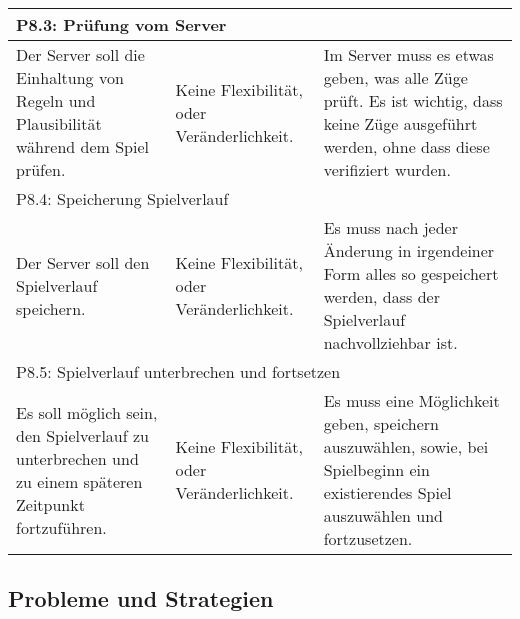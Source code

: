 \documentclass[fontsize=12pt,paper=a4,twoside]{scrartcl}
\begin{document}
\begin{longtable}[c]{|p{5cm}|p{5cm}|p{5cm}|}
\\ \hline
\multicolumn{3}{|l|}{{P8.3: Prüfung vom Server}} 
\\ \hline
Der Server soll die Einhaltung von Regeln und Plausibilität während dem Spiel prüfen.  & Keine Flexibilität, oder Veränderlichkeit.    & Im Server muss es etwas geben, was alle Züge prüft. Es ist wichtig, dass keine Züge ausgeführt werden, ohne dass diese verifiziert wurden. 
\\ \hline
\multicolumn{3}{|l|}{{P8.4: Speicherung Spielverlauf}} 
\\ \hline
Der Server soll den Spielverlauf speichern. & Keine Flexibilität, oder Veränderlichkeit.    & Es muss nach jeder Änderung in irgendeiner Form alles so gespeichert werden, dass der Spielverlauf nachvollziehbar ist. 
\\ \hline
\multicolumn{3}{|l|}{{P8.5: Spielverlauf unterbrechen und fortsetzen}} 
\\ \hline
Es soll möglich sein, den Spielverlauf zu unterbrechen und zu einem späteren Zeitpunkt fortzuführen. & Keine Flexibilität, oder Veränderlichkeit.    & Es muss eine Möglichkeit geben, speichern auszuwählen, sowie, bei Spielbeginn ein existierendes Spiel auszuwählen und fortzusetzen. 
\\ \hline
\end{longtable}

\subsection{Probleme und Strategien} \label{sec:strategien}


\end{document}
